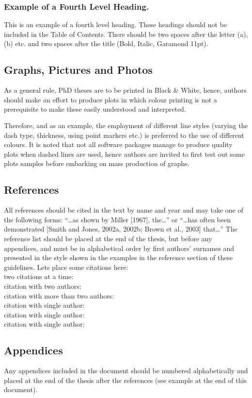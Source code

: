 \subsubsection{Example of a Fourth Level Heading.} 
This is an example of a fourth level heading. These headings should not be included in the Table of Contents. There should be two spaces after the letter (a), (b) etc. and two spaces after the title (Bold, Italic, Garamond 11pt).

\subsection{Graphs, Pictures and Photos}
As a general rule, PhD theses are to be printed in Black \& White, hence, authors should make an effort to produce plots in which colour printing is not a prerequisite to make these easily understood and interpreted.\par
Therefore, and as an example, the employment of different line styles (varying the dash type, thickness, using point markers etc.) is preferred to the use of different colours. It is noted that not all software packages manage to produce quality plots when dashed lines are used, hence authors are invited to first test out some plots samples before embarking on mass production of graphs.
\subsection{References}
All references should be cited in the text by name and year and may take one of the following forms: “…as shown by Miller [1967], the…” or “…has often been demonstrated [Smith and Jones, 2002a, 2002b; Brown et al., 2003] that…” The reference list should be placed at the end of the thesis, but before any appendices, and must be in alphabetical order by first authors’ surnames and presented in the style shown in the examples in the reference section of these guidelines. Lets place some citations here: \\
two citations at a time: \citep{abrahamson1997empirical, pinto2004seismic} \\
citation with two authors: \cite{abrahamson2005opinion} \\
citation with more than two authors: \cite{pinto2004seismic}  \\
citation with single author: \cite{abrams1992strength} \\
citation with single author: \cite{crowley2005investigative} \\
citation with single author: \cite{icc:2003}

\subsection{Appendices}
Any appendices included in the document should be numbered alphabetically and placed at the end of the thesis after the references (see example at the end of this document). \par
[Insert a Section Break (Odd Page) at the end of each Chapter]

